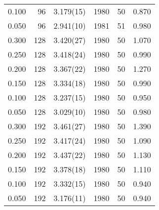 \begin{tabular}{rrlrrr}
 0.100 &      96 & 3.179(15)  &                1980 &                  50 &    0.870 \\
 0.050 &      96 & 2.941(10)  &                1981 &                  51 &    0.980 \\
 0.300 &     128 & 3.420(27)  &                1980 &                  50 &    1.070 \\
 0.250 &     128 & 3.418(24)  &                1980 &                  50 &    0.990 \\
 0.200 &     128 & 3.367(22)  &                1980 &                  50 &    1.270 \\
 0.150 &     128 & 3.334(18)  &                1980 &                  50 &    0.990 \\
 0.100 &     128 & 3.237(15)  &                1980 &                  50 &    0.950 \\
 0.050 &     128 & 3.029(10)  &                1980 &                  50 &    0.980 \\
 0.300 &     192 & 3.461(27)  &                1980 &                  50 &    1.390 \\
 0.250 &     192 & 3.417(24)  &                1980 &                  50 &    1.090 \\
 0.200 &     192 & 3.437(22)  &                1980 &                  50 &    1.130 \\
 0.150 &     192 & 3.378(18)  &                1980 &                  50 &    1.110 \\
 0.100 &     192 & 3.332(15)  &                1980 &                  50 &    0.940 \\
 0.050 &     192 & 3.176(11)  &                1980 &                  50 &    0.940 \\
\hline
\end{tabular}
